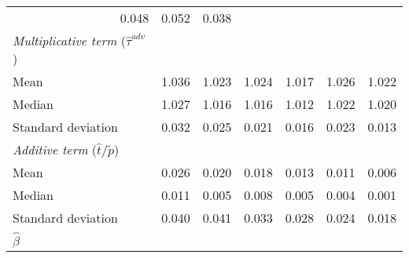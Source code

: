 \begin{tabular}{lllllll}
  \multicolumn{1}{r}{0.048} &
  \multicolumn{1}{r}{0.052} &
  \multicolumn{1}{r}{0.038} \\
\multicolumn{1}{l}{{\textit{Multiplicative term} ($\widehat{\tau}^{adv}$)}} &
  \multicolumn{1}{|r}{} &
  \multicolumn{1}{r}{} &
  \multicolumn{1}{r}{} &
  \multicolumn{1}{r}{} &
  \multicolumn{1}{r}{} &
  \multicolumn{1}{r}{} \\
\multicolumn{1}{l}{\hspace{1em}Mean} &
  \multicolumn{1}{|r}{1.036} &
  \multicolumn{1}{r}{1.023} &
  \multicolumn{1}{r}{1.024} &
  \multicolumn{1}{r}{1.017} &
  \multicolumn{1}{r}{1.026} &
  \multicolumn{1}{r}{1.022} \\
\multicolumn{1}{l}{\hspace{1em}Median} &
  \multicolumn{1}{|r}{1.027} &
  \multicolumn{1}{r}{1.016} &
  \multicolumn{1}{r}{1.016} &
  \multicolumn{1}{r}{1.012} &
  \multicolumn{1}{r}{1.022} &
  \multicolumn{1}{r}{1.020} \\
\multicolumn{1}{l}{\hspace{1em}Standard deviation} &
  \multicolumn{1}{|r}{0.032} &
  \multicolumn{1}{r}{0.025} &
  \multicolumn{1}{r}{0.021} &
  \multicolumn{1}{r}{0.016} &
  \multicolumn{1}{r}{0.023} &
  \multicolumn{1}{r}{0.013} \\
\multicolumn{1}{l}{{\textit{Additive term} ($\widehat{t}/\widetilde{p}$)}} &
  \multicolumn{1}{|r}{} &
  \multicolumn{1}{r}{} &
  \multicolumn{1}{r}{} &
  \multicolumn{1}{r}{} &
  \multicolumn{1}{r}{} &
  \multicolumn{1}{r}{} \\
\multicolumn{1}{l}{\hspace{1em}Mean} &
  \multicolumn{1}{|r}{0.026} &
  \multicolumn{1}{r}{0.020} &
  \multicolumn{1}{r}{0.018} &
  \multicolumn{1}{r}{0.013} &
  \multicolumn{1}{r}{0.011} &
  \multicolumn{1}{r}{0.006} \\
\multicolumn{1}{l}{\hspace{1em}Median} &
  \multicolumn{1}{|r}{0.011} &
  \multicolumn{1}{r}{0.005} &
  \multicolumn{1}{r}{0.008} &
  \multicolumn{1}{r}{0.005} &
  \multicolumn{1}{r}{0.004} &
  \multicolumn{1}{r}{0.001} \\
\multicolumn{1}{l}{\hspace{1em}Standard deviation} &
  \multicolumn{1}{|r}{0.040} &
  \multicolumn{1}{r}{0.041} &
  \multicolumn{1}{r}{0.033} &
  \multicolumn{1}{r}{0.028} &
  \multicolumn{1}{r}{0.024} &
  \multicolumn{1}{r}{0.018} \\
\multicolumn{1}{l}{{$\widehat{\beta}$}} &
  \multicolumn{1}{|r}{} &
  \multicolumn{1}{r}{} &

\end{tabular}
